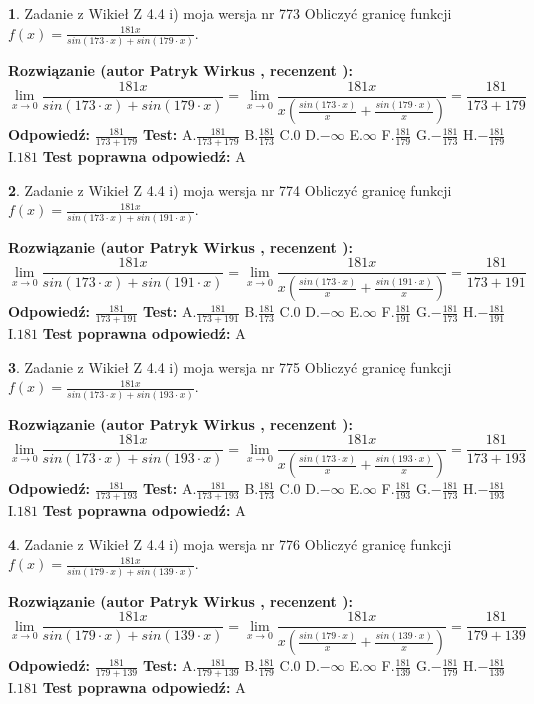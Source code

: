 \documentclass[12pt, a4paper]{article}
\theoremstyle{definition} %
\newtheorem{zad}{}
\newcommand{\zadStart}[1]{\begin{zad}#1\newline}
\newcommand{\zadStop}{\end{zad}}
\newcommand{\rozwStart}[2]{\noindent \textbf{Rozwiązanie (autor #1 , recenzent #2): }\newline}
\newcommand{\rozwStop}{\newline}
\newcommand{\odpStart}{\noindent \textbf{Odpowiedź:}\newline}
\newcommand{\odpStop}{\newline}
\newcommand{\testStart}{\noindent \textbf{Test:}\newline}
\newcommand{\testStop}{\newline}
\newcommand{\kluczStart}{\noindent \textbf{Test poprawna odpowiedź:}\newline}
\newcommand{\kluczStop}{\newline}
\begin{document}
\zadStart{Zadanie z Wikieł Z 4.4 i) moja wersja nr 773}
Obliczyć granicę funkcji $f(x)=\frac{181x}{sin(173\cdot x) +sin(179\cdot x)}$.
\zadStop
\rozwStart{Patryk Wirkus}{}
$$\lim\limits_{x\to 0}\frac{181x}{sin(173\cdot x) +sin(179\cdot x)}=\lim\limits_{x\to 0}\frac{181x}{x(\frac{sin(173\cdot x)}{x}+\frac{sin(179\cdot x)}{x})}=\frac{181}{173+179}$$
\rozwStop
\odpStart
$\frac{181}{173+179}$
\odpStop
\testStart
A.$\frac{181}{173+179}$
B.$\frac{181}{173}$
C.$0$
D.$-\infty$
E.$\infty$
F.$\frac{181}{179}$
G.$-\frac{181}{173}$
H.$-\frac{181}{179}$
I.$181$
\testStop
\kluczStart
A
\kluczStop



\zadStart{Zadanie z Wikieł Z 4.4 i) moja wersja nr 774}
Obliczyć granicę funkcji $f(x)=\frac{181x}{sin(173\cdot x) +sin(191\cdot x)}$.
\zadStop
\rozwStart{Patryk Wirkus}{}
$$\lim\limits_{x\to 0}\frac{181x}{sin(173\cdot x) +sin(191\cdot x)}=\lim\limits_{x\to 0}\frac{181x}{x(\frac{sin(173\cdot x)}{x}+\frac{sin(191\cdot x)}{x})}=\frac{181}{173+191}$$
\rozwStop
\odpStart
$\frac{181}{173+191}$
\odpStop
\testStart
A.$\frac{181}{173+191}$
B.$\frac{181}{173}$
C.$0$
D.$-\infty$
E.$\infty$
F.$\frac{181}{191}$
G.$-\frac{181}{173}$
H.$-\frac{181}{191}$
I.$181$
\testStop
\kluczStart
A
\kluczStop



\zadStart{Zadanie z Wikieł Z 4.4 i) moja wersja nr 775}
Obliczyć granicę funkcji $f(x)=\frac{181x}{sin(173\cdot x) +sin(193\cdot x)}$.
\zadStop
\rozwStart{Patryk Wirkus}{}
$$\lim\limits_{x\to 0}\frac{181x}{sin(173\cdot x) +sin(193\cdot x)}=\lim\limits_{x\to 0}\frac{181x}{x(\frac{sin(173\cdot x)}{x}+\frac{sin(193\cdot x)}{x})}=\frac{181}{173+193}$$
\rozwStop
\odpStart
$\frac{181}{173+193}$
\odpStop
\testStart
A.$\frac{181}{173+193}$
B.$\frac{181}{173}$
C.$0$
D.$-\infty$
E.$\infty$
F.$\frac{181}{193}$
G.$-\frac{181}{173}$
H.$-\frac{181}{193}$
I.$181$
\testStop
\kluczStart
A
\kluczStop



\zadStart{Zadanie z Wikieł Z 4.4 i) moja wersja nr 776}
Obliczyć granicę funkcji $f(x)=\frac{181x}{sin(179\cdot x) +sin(139\cdot x)}$.
\zadStop
\rozwStart{Patryk Wirkus}{}
$$\lim\limits_{x\to 0}\frac{181x}{sin(179\cdot x) +sin(139\cdot x)}=\lim\limits_{x\to 0}\frac{181x}{x(\frac{sin(179\cdot x)}{x}+\frac{sin(139\cdot x)}{x})}=\frac{181}{179+139}$$
\rozwStop
\odpStart
$\frac{181}{179+139}$
\odpStop
\testStart
A.$\frac{181}{179+139}$
B.$\frac{181}{179}$
C.$0$
D.$-\infty$
E.$\infty$
F.$\frac{181}{139}$
G.$-\frac{181}{179}$
H.$-\frac{181}{139}$
I.$181$
\testStop
\kluczStart
A
\kluczStop
\end{document}
